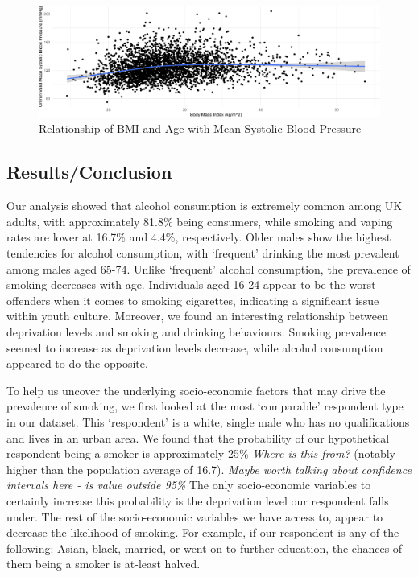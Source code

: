 \documentclass[
  11pt,
]{article}
\begin{document}
\begin{figure}[H]
\includegraphics{Coursework_files/figure-latex/output relationship plots-1} \caption{Relationship of BMI and Age with Mean Systolic Blood Pressure}\label{fig:output relationship plots}
\end{figure}

\subsection{Results/Conclusion}\label{resultsconclusion}

Our analysis showed that alcohol consumption is extremely common among
UK adults, with approximately 81.8\% being consumers, while smoking and
vaping rates are lower at 16.7\% and 4.4\%, respectively. Older males
show the highest tendencies for alcohol consumption, with `frequent'
drinking the most prevalent among males aged 65-74. Unlike `frequent'
alcohol consumption, the prevalence of smoking decreases with age.
Individuals aged 16-24 appear to be the worst offenders when it comes to
smoking cigarettes, indicating a significant issue within youth culture.
Moreover, we found an interesting relationship between deprivation
levels and smoking and drinking behaviours. Smoking prevalence seemed to
increase as deprivation levels decrease, while alcohol consumption
appeared to do the opposite.

To help us uncover the underlying socio-economic factors that may drive
the prevalence of smoking, we first looked at the most `comparable'
respondent type in our dataset. This `respondent' is a white, single
male who has no qualifications and lives in an urban area. We found that
the probability of our hypothetical respondent being a smoker is
approximately 25\% \emph{Where is this from?} (notably higher than the
population average of 16.7). \emph{Maybe worth talking about confidence
intervals here - is value outside 95\%} The only socio-economic
variables to certainly increase this probability is the deprivation
level our respondent falls under. The rest of the socio-economic
variables we have access to, appear to decrease the likelihood of
smoking. For example, if our respondent is any of the following: Asian,
black, married, or went on to further education, the chances of them
being a smoker is at-least halved.
\end{document}
